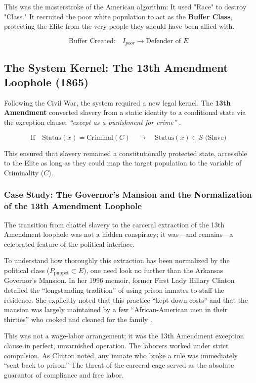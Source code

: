 \documentclass[12pt]{article}
\begin{document}
This was the masterstroke of the American algorithm: It used "Race" to destroy "Class." It recruited the poor white population to act as the \textbf{Buffer Class}, protecting the Elite from the very people they should have been allied with.

\[
\text{Buffer Created:} \quad I_{poor} \rightarrow \text{Defender of } E
\]

\subsection{The System Kernel: The 13th Amendment Loophole (1865)}
Following the Civil War, the system required a new legal kernel. The \textbf{13th Amendment} converted slavery from a static identity to a conditional state via the exception clause: \textit{``except as a punishment for crime''} \cite{alexander, blackmon, thirteenth}.

\[
\text{If} \quad \text{Status}(x) = \text{Criminal}(C) \quad \rightarrow \quad \text{Status}(x) \in S \text{ (Slave)}
\]

This ensured that slavery remained a constitutionally protected state, accessible to the Elite as long as they could map the target population to the variable of Criminality ($C$).

\subsubsection*{Case Study: The Governor's Mansion and the Normalization of the 13th Amendment Loophole}

The transition from chattel slavery to the carceral extraction of the 13th Amendment loophole was not a hidden conspiracy; it was---and remains---a celebrated feature of the political interface.

To understand how thoroughly this extraction has been normalized by the political class ($P_{\text{puppet}} \subset E$), one need look no further than the Arkansas Governor's Mansion. In her 1996 memoir, former First Lady Hillary Clinton detailed the ``longstanding tradition'' of using prison inmates to staff the residence. She explicitly noted that this practice ``kept down costs'' and that the mansion was largely maintained by a few ``African-American men in their thirties'' who cooked and cleaned for the family \cite{clinton_village}.

This was not a wage-labor arrangement; it was the 13th Amendment exception clause in perfect, unvarnished operation. The laborers worked under strict compulsion. As Clinton noted, any inmate who broke a rule was immediately ``sent back to prison.'' The threat of the carceral cage served as the absolute guarantor of compliance and free labor.
\end{document}
